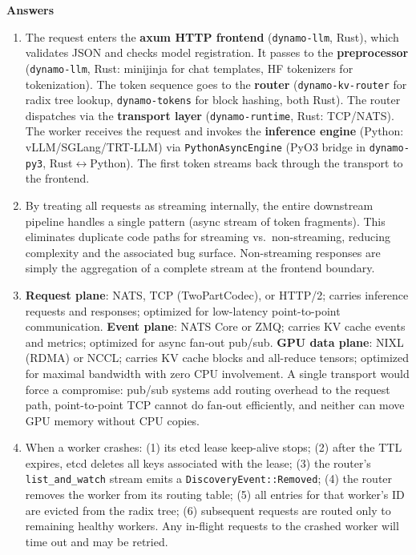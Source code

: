 \medskip
\noindent\textbf{Answers}

\medskip

\begin{enumerate}
  \item The request enters the \textbf{axum HTTP frontend} (\texttt{dynamo-llm}, Rust), which validates JSON and checks model registration. It passes to the \textbf{preprocessor} (\texttt{dynamo-llm}, Rust: minijinja for chat templates, HF tokenizers for tokenization). The token sequence goes to the \textbf{router} (\texttt{dynamo-kv-router} for radix tree lookup, \texttt{dynamo-tokens} for block hashing, both Rust). The router dispatches via the \textbf{transport layer} (\texttt{dynamo-runtime}, Rust: TCP/NATS). The worker receives the request and invokes the \textbf{inference engine} (Python: vLLM/SGLang/TRT-LLM) via \texttt{PythonAsyncEngine} (PyO3 bridge in \texttt{dynamo-py3}, Rust$\leftrightarrow$Python). The first token streams back through the transport to the frontend.

  \item By treating all requests as streaming internally, the entire downstream pipeline handles a single pattern (async stream of token fragments). This eliminates duplicate code paths for streaming vs.\ non-streaming, reducing complexity and the associated bug surface. Non-streaming responses are simply the aggregation of a complete stream at the frontend boundary.

  \item \textbf{Request plane}: NATS, TCP (TwoPartCodec), or HTTP/2; carries inference requests and responses; optimized for low-latency point-to-point communication. \textbf{Event plane}: NATS Core or ZMQ; carries KV cache events and metrics; optimized for async fan-out pub/sub. \textbf{GPU data plane}: NIXL (RDMA) or NCCL; carries KV cache blocks and all-reduce tensors; optimized for maximal bandwidth with zero CPU involvement. A single transport would force a compromise: pub/sub systems add routing overhead to the request path, point-to-point TCP cannot do fan-out efficiently, and neither can move GPU memory without CPU copies.

  \item When a worker crashes: (1) its etcd lease keep-alive stops; (2) after the TTL expires, etcd deletes all keys associated with the lease; (3) the router's \texttt{list\_and\_watch} stream emits a \texttt{DiscoveryEvent::Removed}; (4) the router removes the worker from its routing table; (5) all entries for that worker's ID are evicted from the radix tree; (6) subsequent requests are routed only to remaining healthy workers. Any in-flight requests to the crashed worker will time out and may be retried.


\end{enumerate}
